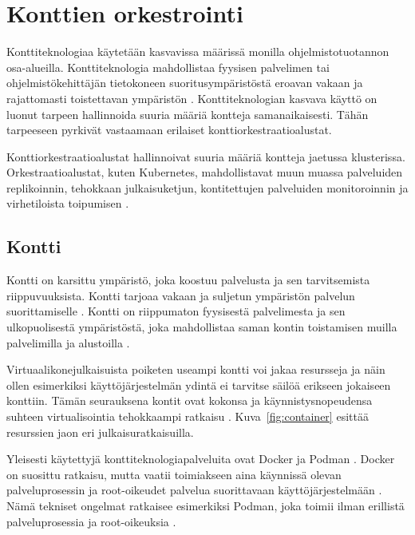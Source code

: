 \chapter{Konttien orkestrointi\label{orchestration}}

Konttiteknologiaa käytetään kasvavissa määrissä monilla ohjelmistotuotannon osa-alueilla.
Konttiteknologia mahdollistaa fyysisen palvelimen tai ohjelmistökehittäjän tietokoneen suoritusympäristöstä eroavan vakaan ja rajattomasti toistettavan ympäristön \cite{Watada19}.
Konttiteknologian kasvava käyttö on luonut tarpeen hallinnoida suuria määriä kontteja samanaikaisesti.
Tähän tarpeeseen pyrkivät vastaamaan erilaiset konttiorkestraatioalustat.

Konttiorkestraatioalustat hallinnoivat suuria määriä kontteja jaetussa klusterissa.
Orkestraatioalustat, kuten Kubernetes, mahdollistavat muun muassa palveluiden replikoinnin, tehokkaan julkaisuketjun, kontitettujen palveluiden monitoroinnin ja virhetiloista toipumisen \cite{Khan17}.

\section{Kontti}

Kontti on karsittu ympäristö, joka koostuu palvelusta ja sen tarvitsemista riippuvuuksista.
Kontti tarjoaa vakaan ja suljetun ympäristön palvelun suorittamiselle \cite{Watada19}.
Kontti on riippumaton fyysisestä palvelimesta ja sen ulkopuolisestä ympäristöstä, joka mahdollistaa saman kontin toistamisen muilla palvelimilla ja alustoilla \cite{Saha18}.

Virtuaalikonejulkaisuista poiketen useampi kontti voi jakaa resursseja ja näin ollen esimerkiksi käyttöjärjestelmän ydintä ei tarvitse säilöä erikseen jokaiseen konttiin.
Tämän seurauksena kontit ovat kokonsa ja käynnistysnopeudensa suhteen virtualisointia tehokkaampi ratkaisu \cite{Dua14}.
Kuva~\ref{fig:container} esittää resurssien jaon eri julkaisuratkaisuilla.

Yleisesti käytettyjä konttiteknologiapalveluita ovat Docker ja Podman \cite{Abraham20, Bernstein14}.
Docker on suosittu ratkaisu, mutta vaatii toimiakseen aina käynnissä olevan palveluprosessin ja root-oikeudet palvelua suorittavaan käyttöjärjestelmään \cite{Abraham20}.
Nämä tekniset ongelmat ratkaisee esimerkiksi Podman, joka toimii ilman erillistä palveluprosessia ja root-oikeuksia \cite{Gantikow20}.

\pagebreak %

